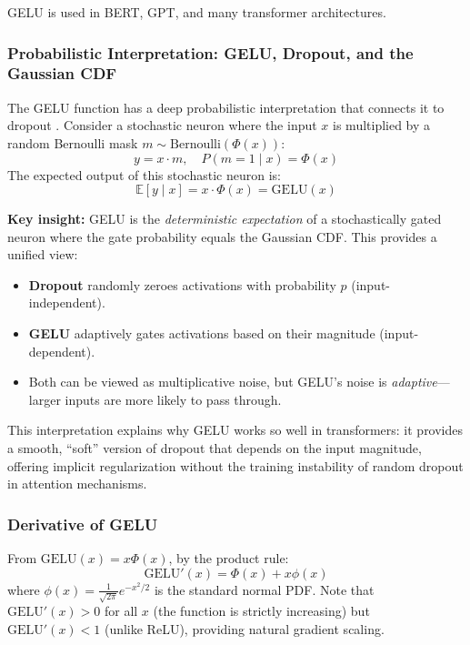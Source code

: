 GELU is used in BERT, GPT, and many transformer architectures.

\subsubsection{Probabilistic Interpretation: GELU, Dropout, and the Gaussian CDF}

The GELU function has a deep probabilistic interpretation that connects it to dropout \cite{clark2022unified}. Consider a stochastic neuron where the input $x$ is multiplied by a random Bernoulli mask $m \sim \text{Bernoulli}(\Phi(x))$:
\begin{equation}
y = x \cdot m, \quad P(m = 1 \mid x) = \Phi(x)
\end{equation}
The expected output of this stochastic neuron is:
\begin{equation}
\mathbb{E}[y \mid x] = x \cdot \Phi(x) = \text{GELU}(x)
\end{equation}

\textbf{Key insight:} GELU is the \emph{deterministic expectation} of a stochastically gated neuron where the gate probability equals the Gaussian CDF. This provides a unified view:
\begin{itemize}
    \item \textbf{Dropout} randomly zeroes activations with probability $p$ (input-independent).
    \item \textbf{GELU} adaptively gates activations based on their magnitude (input-dependent).
    \item Both can be viewed as multiplicative noise, but GELU's noise is \emph{adaptive}---larger inputs are more likely to pass through.
\end{itemize}

This interpretation explains why GELU works so well in transformers: it provides a smooth, ``soft'' version of dropout that depends on the input magnitude, offering implicit regularization without the training instability of random dropout in attention mechanisms.

\subsubsection{Derivative of GELU}

From $\text{GELU}(x) = x\Phi(x)$, by the product rule:
\begin{equation}
\text{GELU}'(x) = \Phi(x) + x\phi(x)
\end{equation}
where $\phi(x) = \frac{1}{\sqrt{2\pi}}e^{-x^2/2}$ is the standard normal PDF. Note that $\text{GELU}'(x) > 0$ for all $x$ (the function is strictly increasing) but $\text{GELU}'(x) < 1$ (unlike ReLU), providing natural gradient scaling.

